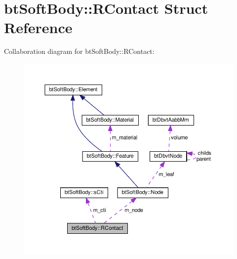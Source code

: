 \hypertarget{structbtSoftBody_1_1RContact}{}\section{bt\+Soft\+Body\+:\+:R\+Contact Struct Reference}
\label{structbtSoftBody_1_1RContact}


Collaboration diagram for bt\+Soft\+Body\+:\+:R\+Contact\+:
\nopagebreak
\begin{figure}[H]
\begin{center}
\leavevmode
\includegraphics[width=350pt]{structbtSoftBody_1_1RContact__coll__graph}
\end{center}
\end{figure}
